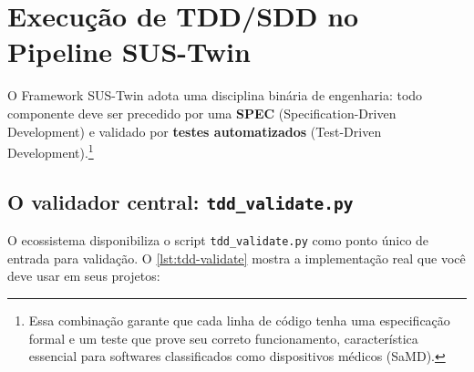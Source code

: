\section{Execução de TDD/SDD no Pipeline SUS-Twin}
\label{sec:opencode-tdd}

O Framework SUS-Twin adota uma disciplina binária de engenharia: todo
componente deve ser precedido por uma \textbf{SPEC} (Specification-Driven
Development) e validado por \textbf{testes automatizados} (Test-Driven
Development).\footnote{Essa combinação garante que cada linha de código tenha
uma especificação formal e um teste que prove seu correto funcionamento,
característica essencial para softwares classificados como dispositivos
médicos (SaMD).}

\subsection{O validador central: \texttt{tdd\_validate.py}}

O ecossistema disponibiliza o script \texttt{tdd\_validate.py} como ponto
único de entrada para validação. O \autoref{lst:tdd-validate} mostra a
implementação real que você deve usar em seus projetos:

